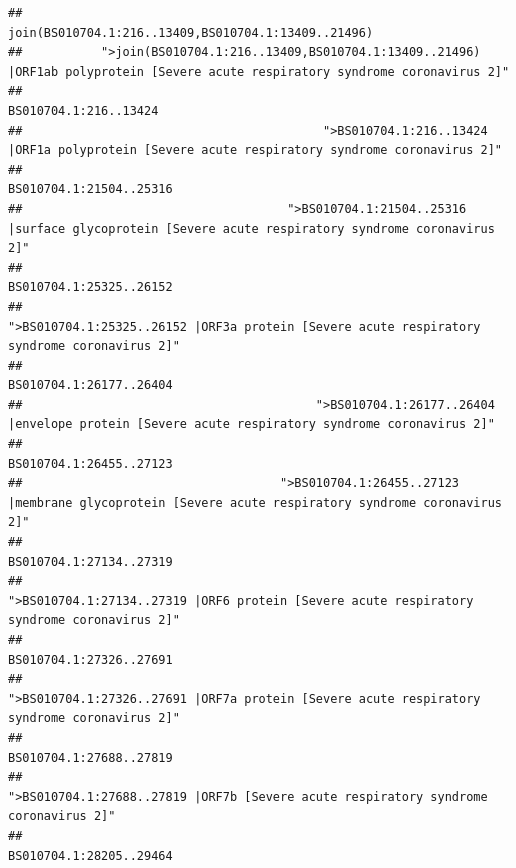 \documentclass[
]{article}
\begin{document}
\begin{verbatim}
##                                                                                    join(BS010704.1:216..13409,BS010704.1:13409..21496) 
##           ">join(BS010704.1:216..13409,BS010704.1:13409..21496) |ORF1ab polyprotein [Severe acute respiratory syndrome coronavirus 2]" 
##                                                                                                                  BS010704.1:216..13424 
##                                          ">BS010704.1:216..13424 |ORF1a polyprotein [Severe acute respiratory syndrome coronavirus 2]" 
##                                                                                                                BS010704.1:21504..25316 
##                                     ">BS010704.1:21504..25316 |surface glycoprotein [Severe acute respiratory syndrome coronavirus 2]" 
##                                                                                                                BS010704.1:25325..26152 
##                                            ">BS010704.1:25325..26152 |ORF3a protein [Severe acute respiratory syndrome coronavirus 2]" 
##                                                                                                                BS010704.1:26177..26404 
##                                         ">BS010704.1:26177..26404 |envelope protein [Severe acute respiratory syndrome coronavirus 2]" 
##                                                                                                                BS010704.1:26455..27123 
##                                    ">BS010704.1:26455..27123 |membrane glycoprotein [Severe acute respiratory syndrome coronavirus 2]" 
##                                                                                                                BS010704.1:27134..27319 
##                                             ">BS010704.1:27134..27319 |ORF6 protein [Severe acute respiratory syndrome coronavirus 2]" 
##                                                                                                                BS010704.1:27326..27691 
##                                            ">BS010704.1:27326..27691 |ORF7a protein [Severe acute respiratory syndrome coronavirus 2]" 
##                                                                                                                BS010704.1:27688..27819 
##                                                    ">BS010704.1:27688..27819 |ORF7b [Severe acute respiratory syndrome coronavirus 2]" 
##                                                                                                                BS010704.1:28205..29464 

\end{verbatim}
\end{document}

